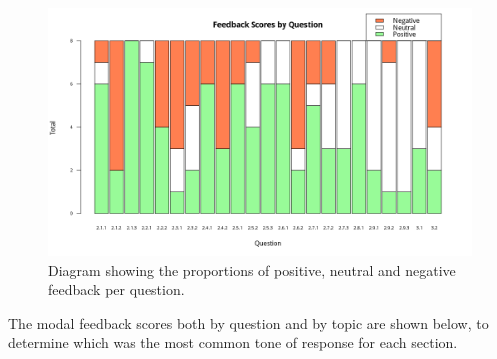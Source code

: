\documentclass[12pt,twoside,notitlepage,xetex]{report}
\begin{document}
\begin{center}
\begin{figure}[H]
\begin{center}
\includegraphics[width=\textwidth]{figs/graphs/stacked-scores.png}
\end{center}
\caption{Diagram showing the proportions of positive, neutral and negative feedback per question.}
\label{fig:StackedScores}
\end{figure}
\end{center}

The modal feedback scores both by question and by topic are shown below, to determine which was the most common tone of response for each section.
\end{document}
